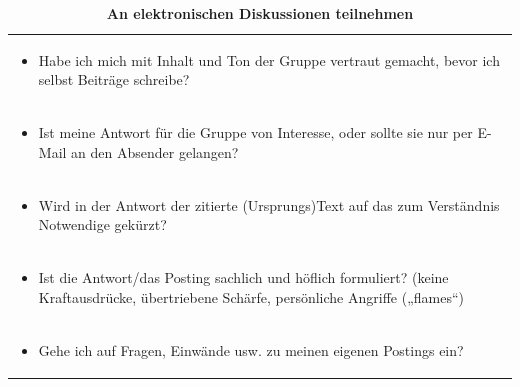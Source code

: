 \documentclass[]{book}
\providecommand{\tightlist}{%
  \setlength{\itemsep}{0pt}\setlength{\parskip}{0pt}}
\theoremstyle{definition}
\theoremstyle{definition}
\theoremstyle{definition}
\theoremstyle{remark}
\begin{document}
\begin{longtable}[]{@{}l@{}}
\caption{\textbf{\label{tab:elektronische-diskussionen} An elektronischen
Diskussionen teilnehmen}}\tabularnewline
\toprule
\begin{minipage}[t]{0.97\columnwidth}\raggedright\strut
\begin{itemize}
\tightlist
\item
  Habe ich mich mit Inhalt und Ton der Gruppe vertraut gemacht, bevor
  ich selbst Beiträge schreibe? \vspace{-6mm}
\end{itemize}\strut
\end{minipage}\tabularnewline
\begin{minipage}[t]{0.97\columnwidth}\raggedright\strut
\begin{itemize}
\tightlist
\item
  Ist meine Antwort für die Gruppe von Interesse, oder sollte sie nur
  per E- Mail an den Absender gelangen? \vspace{-6mm}
\end{itemize}\strut
\end{minipage}\tabularnewline
\begin{minipage}[t]{0.97\columnwidth}\raggedright\strut
\begin{itemize}
\tightlist
\item
  Wird in der Antwort der zitierte (Ursprungs)Text auf das zum
  Verständnis Notwendige gekürzt? \vspace{-6mm}
\end{itemize}\strut
\end{minipage}\tabularnewline
\begin{minipage}[t]{0.97\columnwidth}\raggedright\strut
\begin{itemize}
\tightlist
\item
  Ist die Antwort/das Posting sachlich und höflich formuliert? (keine
  Kraftausdrücke, übertriebene Schärfe, persönliche Angriffe („flames``)
  \vspace{-6mm}
\end{itemize}\strut
\end{minipage}\tabularnewline
\begin{minipage}[t]{0.97\columnwidth}\raggedright\strut
\begin{itemize}
\tightlist
\item
  Gehe ich auf Fragen, Einwände usw. zu meinen eigenen Postings ein?
\end{itemize}\strut
\end{minipage}\tabularnewline
\bottomrule
\end{longtable}
\end{document}
